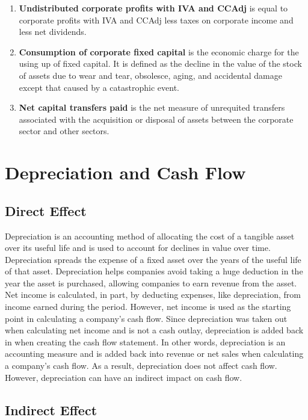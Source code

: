 \documentclass{article}
\begin{document}
{\begin{enumerate}
	\item \textbf{Undistributed corporate profits with IVA and CCAdj} is equal to corporate profits with IVA and CCAdj less taxes on corporate income and less net dividends.
	\item \textbf{Consumption of corporate fixed capital} is the economic charge for the using up of fixed capital. It is defined as the decline in the value of the stock of assets due to wear and tear, obsolesce, aging, and accidental damage except that caused by a catastrophic event. 
	\item \textbf{Net capital transfers paid} is the net measure of unrequited transfers associated with the acquisition or disposal of assets between the corporate sector and other sectors.
\end{enumerate} 


\section*{Depreciation and Cash Flow}


\subsection*{Direct Effect}

Depreciation is an accounting method of allocating the cost of a tangible asset over its useful life and is used to account for declines in value over time. Depreciation spreads the expense of a fixed asset over the years of the useful life of that asset. Depreciation helps companies avoid taking a huge deduction in the year the asset is purchased, allowing companies to earn revenue from the asset. Net income is calculated, in part, by deducting expenses, like depreciation, from income earned during the period. However, net income is used as the starting point in calculating a company's cash flow. Since depreciation was taken out when calculating net income and is not a cash outlay,  depreciation is added back in when creating the cash flow statement. In other words, depreciation is an accounting measure and is added back into revenue or net sales when calculating a company's cash flow. As a result, depreciation does not affect cash flow. However, depreciation can have an indirect impact on cash flow.


\subsection*{Indirect Effect}

}
\end{document}
